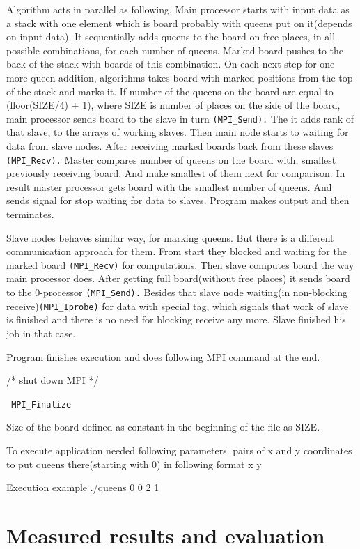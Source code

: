 \documentclass[12pt]{article}
\begin{document}
Algorithm acts in parallel as following.
Main processor starts with input data as a stack with one element which is board probably with queens put on it(depends on input data). It sequentially adds queens to the board on free places, in all possible combinations, for each number of queens.
Marked board pushes to the back of the stack with boards of this combination. On each next step for one more queen addition, algorithms takes board with marked positions from the top of the stack and marks it.
If number of the queens on the board are equal to (floor(SIZE/4) + 1), where SIZE is number of places on the side of the board, main processor sends board to the slave in turn \verb|(MPI_Send).| The it adds rank of that slave, to the arrays of working slaves.
Then main node starts to waiting for data from slave nodes.
After receiving marked boards back from these slaves \verb|(MPI_Recv).| Master compares number of queens on the board with, smallest previously receiving board. And make smallest of them next for comparison.
In result master processor gets board with the smallest number of queens.
And sends signal for stop waiting for data to slaves. Program makes output and then terminates.

Slave nodes behaves similar way, for marking queens. But there is a different communication approach for them. From start they blocked and waiting for the marked board \verb|(MPI_Recv)| for computations. Then slave computes board the way main processor does. After getting full board(without free places) it sends board to the 0-processor \verb|(MPI_Send).|
Besides that slave node waiting(in non-blocking receive)\verb|(MPI_Iprobe)| for data with special tag, which signals that work of slave is finished and there is no need for blocking receive any more. Slave finished his job in that case.

Program finishes execution and does following MPI command at the end.

/* shut down MPI */

\verb| MPI_Finalize|

Size of the board defined as constant in the beginning of the file as SIZE.

To execute application needed following parameters.
pairs of x and y coordinates to put queens there(starting with 0) in following format x y

Execution example
./queens 0 0 2 1




\section{Measured results and evaluation}
\end{document}
